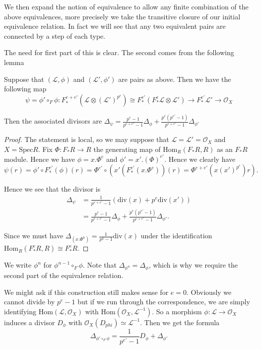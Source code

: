 \documentclass[a4paper,12pt]{book}
\newcommand{\Hom}{\text{Hom}}
\newcommand{\Fe}{F^{e}_{*}}
\newcommand{\ox}{\mathcal{O}_{X}}
\begin{document}
We then expand the notion of equivalence to allow any finite combination of the above equivalences, more precisely we take the transitive closure of our initial equivalence relation. In fact we will see that any two equivalent pairs are connected by a step of each type.

The need for first part of this is clear. The second comes from the following lemma

\begin{lemma}\label{twist}
	Suppose that $(\mathcal{L},\phi)$ and $(\mathcal{L}',\phi')$ are pairs as above. Then we have the following map
	\[\psi= \phi' \circ_{F} \phi: F^{e+e'}_{*}(\mathcal{L}\otimes (\mathcal{L}')^{p^{e}})\cong F_{*}^{e'}(\Fe \mathcal{L} \otimes \mathcal{L}')\to F^{e'}_{*}\mathcal{L}'\to \ox \]
	
	Then the associated divisors are $\Delta_{\psi}= \frac{p^{e}-1}{p^{e+e'}-1}\Delta_{\phi} + \frac{p^{e}(p^{e'}-1)}{p^{e+e'}-1}\Delta_{\phi'}$
\end{lemma}

\begin{proof}
	
	The statement is local, so we may suppose that $\mathcal{L}=\mathcal{L}'=\mathcal{O}_{X}$ and $X= \text{Spec}R$. Fix $\Phi: F_{*}R \to R$ the generating map of $\Hom_{R}(F_{*}R,R)$ as an $F_{*}R$ module. Hence we have $\phi=x.\Phi^{e}$ and $\phi'=x'.(\Phi)^{e'}$. Hence we clearly have $$\psi(r)=\phi'\circ F_{*}^{e'}(\phi)(r)= \Phi^{e'}\circ (x'(F_{*}^{e'}(x.\Phi^{e}))(r)=\Phi^{e+e'}(x(x')^{p^{e}})r).$$
	
	
	Hence we see that the divisor is 
	\begin{align*}
	\Delta_{\psi} &= \frac{1}{p^{e+e'}-1}(\text{div}(x) + p^{e}\text{div}(x')) \\
	&=\frac{p^{e}-1}{p^{e+e'}-1}\Delta_{\phi} + \frac{p^{e}(p^{e'}-1)}{p^{e+e'}-1}\Delta_{\phi'}.
	\end{align*}
	
	Since we must have $\Delta_{(x.\Phi^{k})}= \frac{1}{p^{k}-1} \text{div}(x)$ under the identification $\Hom_{R}(\Fe R,R) \cong \Fe R$.

	
\end{proof}

We write $\phi^{n}$ for $\phi^{n-1}\circ_{F} \phi$. Note that $\Delta_{\phi^{n}}=\Delta_{\phi}$, which is why we require the second part of the equivalence relation.

We might ask if this construction still makes sense for $e=0$. Obviously we cannot divide by $p^{e}-1$ but if we run through the correspondence, we are simply identifying $\Hom(\mathcal{L},\ox)$ with $\Hom(\ox,\mathcal{L}^{-1})$. So a morphism $\phi: \mathcal{L} \to \ox$ induces a divisor $D_{\phi}$ with $\ox(D_{phi})\simeq \mathcal{L}^{-1}$. Then we get the formula
\[\Delta_{\phi' \circ_{F} \phi}= \frac{1}{p^{e'}-1}D_{\phi} + \Delta_{\phi'}\]
\end{document}
